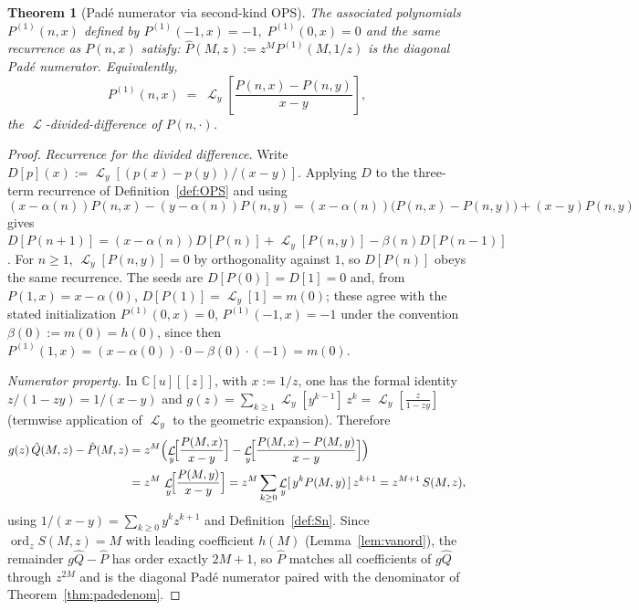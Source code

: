 \documentclass[11pt]{article}
\newtheorem{theorem}{Theorem}[section]
\theoremstyle{definition}
\DeclareMathOperator{\Lop}{\mathcal{L}}
\DeclareMathOperator{\ord}{ord}
\begin{document}
\begin{theorem}[Pad\'e numerator via second-kind OPS]\label{thm:padenum}
The associated polynomials $P^{(1)}(n,x)$ defined by
$P^{(1)}(-1,x) = -1,\; P^{(1)}(0,x) = 0$ and the same recurrence as
$P(n,x)$ satisfy: $\hat P(M,z) := z^{M} P^{(1)}(M, 1/z)$ is the diagonal
Pad\'e numerator. Equivalently,
\[
P^{(1)}(n,x) \;=\; \Lop_{y}\!\left[ \frac{P(n,x) - P(n,y)}{x - y} \right],
\]
the $\Lop$-divided-difference of $P(n,\cdot)$.
\end{theorem}

\begin{proof}
\emph{Recurrence for the divided difference.} Write
$D[p](x) := \Lop_{y}[(p(x)-p(y))/(x-y)]$. Applying $D$ to the
three-term recurrence of Definition~\ref{def:OPS} and using
\[
(x-\alpha(n))P(n,x) - (y-\alpha(n))P(n,y)
= (x-\alpha(n))\bigl(P(n,x)-P(n,y)\bigr) + (x-y)P(n,y)
\]
gives $D[P(n+1)] = (x-\alpha(n))D[P(n)] + \Lop_{y}[P(n,y)]
- \beta(n)D[P(n-1)]$. For $n\geq 1$, $\Lop_{y}[P(n,y)] = 0$ by
orthogonality against $1$, so $D[P(n)]$ obeys the same recurrence.
The seeds are $D[P(0)] = D[1] = 0$ and, from
$P(1,x) = x - \alpha(0)$, $D[P(1)] = \Lop_{y}[1] = m(0)$; these agree
with the stated initialization $P^{(1)}(0,x) = 0$,
$P^{(1)}(-1,x) = -1$ under the convention $\beta(0) := m(0) = h(0)$,
since then $P^{(1)}(1,x) = (x-\alpha(0))\cdot 0 - \beta(0)\cdot(-1)
= m(0)$.

\emph{Numerator property.} In $\mathbb{C}[u][[z]]$, with $x := 1/z$,
one has the formal identity $z/(1-zy) = 1/(x-y)$ and
$g(z) = \sum_{k\geq 1} \Lop_{y}[y^{k-1}]\,z^{k}
= \Lop_{y}\!\left[\frac{z}{1-zy}\right]$
(termwise application of $\Lop_{y}$ to the geometric expansion).
Therefore
\begin{align*}
g(z)\,\hat Q(M,z) - \hat P(M,z)
&= z^{M}\Bigl( \Lop_{y}\!\Bigl[\frac{P(M,x)}{x-y}\Bigr]
- \Lop_{y}\!\Bigl[\frac{P(M,x)-P(M,y)}{x-y}\Bigr] \Bigr) \\
&= z^{M}\,\Lop_{y}\!\Bigl[\frac{P(M,y)}{x-y}\Bigr]
= z^{M}\sum_{k\geq 0} \Lop_{y}[\,y^{k}P(M,y)\,]\, z^{k+1}
= z^{M+1}\, S(M,z),
\end{align*}
using $1/(x-y) = \sum_{k\geq 0} y^{k}z^{k+1}$ and
Definition~\ref{def:Sn}. Since $\ord_{z}S(M,z) = M$ with leading
coefficient $h(M)$ (Lemma~\ref{lem:vanord}), the remainder
$g\hat Q - \hat P$ has order exactly $2M+1$, so $\hat P$ matches all
coefficients of $g\hat Q$ through $z^{2M}$ and is the diagonal
Pad\'e numerator paired with the denominator of
Theorem~\ref{thm:padedenom}.
\end{proof}
\end{document}
